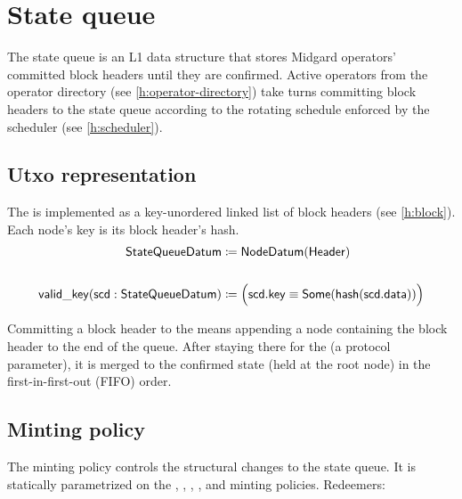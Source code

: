 \documentclass[../midgard.tex]{subfiles}
\begin{document}
\section{State queue}
\label{h:state-queue}

The state queue is an L1 data structure that stores Midgard operators' committed block headers until they are confirmed.
Active operators from the operator directory (see \cref{h:operator-directory}) take turns committing block headers to the state queue according to the rotating schedule enforced by the scheduler (see \cref{h:scheduler}).

\subsection{Utxo representation}
\label{h:state-queue-utxo-representation}

The  is implemented as a key-unordered linked list of block headers (see \cref{h:block}).
Each  node's key is its block header's hash.
\begin{align*}
    \mathsf{StateQueueDatum} &\coloneq \mathsf{NodeDatum}(\mathsf{Header}) \\ \\
    \mathsf{valid\_key}(\mathsf{scd} : \mathsf{StateQueueDatum}) &\coloneq
        \Bigl( \mathsf{scd.key} \equiv \mathsf{Some}(\mathsf{hash}(\mathsf{scd.data})) \Bigr)
\end{align*}

Committing a block header to the  means appending a node containing the block header to the end of the queue.
After staying there for the  (a protocol parameter), it is merged to the confirmed state (held at the  root node) in the first-in-first-out (FIFO) order.

\subsection{Minting policy}
\label{h:state-queue-minting-policy}

The  minting policy controls the structural changes to the state queue.
It is statically parametrized on the , , , , and  minting policies.
Redeemers:
\end{document}
